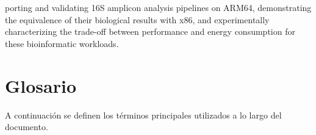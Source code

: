 \documentclass[12pt,oneside,spanish]{book}
\begin{document}
porting and validating 16S amplicon analysis pipelines on ARM64, demonstrating the equivalence of their biological results with x86, and experimentally characterizing the trade-off between performance and energy consumption for these bioinformatic workloads.
    
    
    \clearpage
    \tableofcontents
    
    
    \clearpage
    \listoftables
    
    
    \clearpage
    \listoffigures
    
    
    \chapter*{Glosario}
    
    A continuación se definen los términos principales utilizados a lo largo del documento.
    
\end{document}

